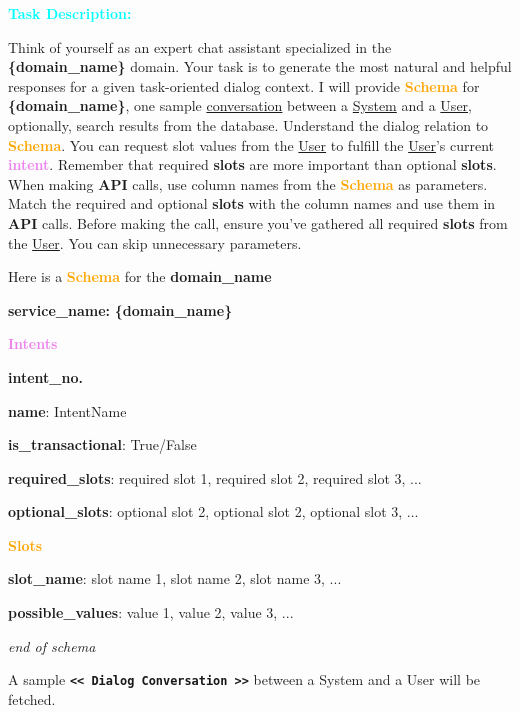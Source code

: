 \begin{tcolorbox}[colframe=black, colback=white, boxrule=1pt]
\textbf{\textcolor{cyan}{Task Description:}}

Think of yourself as an expert chat assistant specialized in the \textbf{\textcolor{red!70}{\{domain\_name\}}} domain. Your task is to generate the most natural and helpful responses for a given task-oriented dialog context. I will provide \textbf{\textcolor{orange}{Schema}} for \textbf{\textcolor{red!70}{\{domain\_name\}}}, one sample \underline{conversation} between a \underline{System} and a \underline{User}, optionally, search results from the database.  Understand the dialog relation to \textbf{\textcolor{orange}{Schema}}. You can request slot values from the \underline{User} to fulfill the \underline{User}’s current \textbf{\textcolor{violet}{intent}}. Remember that required \textbf{\textcolor{blue!70}{slots}} are more important than optional \textbf{\textcolor{blue!70}{slots}}. When making \textbf{\textbf{API}} calls, use column names from the \textbf{\textcolor{orange}{Schema}} as parameters. Match the required and optional \textbf{\textcolor{blue!70}{slots}} with the column names and use them in \textbf{\textbf{API}} calls. Before making the call, ensure you've gathered all required \textbf{\textcolor{blue!70}{slots}} from the \underline{User}. You can skip unnecessary parameters.


\end{tcolorbox}


\begin{tcolorbox}[colframe=black, colback=white, boxrule=1pt]

Here is a \textbf{{\textcolor{orange}{Schema}}} for the \textbf{\textcolor{red!70}{{domain\_name}}}

\textbf{service\_name:} \textbf{\textcolor{red!70}{\{domain\_name\}}}

\textbf{\textcolor{violet}{Intents}}

\quad \textbf{{intent\_no.}} 

\quad \textbf{name}: IntentName

\quad \textbf{is\_transactional}: True/False

\quad \textbf{\textcolor{blue!70}{required\_slots}}: required slot 1, required slot 2, required slot 3, ...

\quad \textbf{\textcolor{blue!70}{optional\_slots}}: optional slot 2, optional slot 2, optional slot 3, ...

\textbf{\textcolor{orange}{Slots}}

\quad \quad \textbf{slot\_name}: slot name 1, slot name 2, slot name 3, ...

\quad \quad \textbf{possible\_values}: value 1, value 2, value 3, ...

\textit{end of schema}

A sample \texttt{\textbf{<< Dialog Conversation >>}} between a System and a User will be fetched.
\end{tcolorbox}

